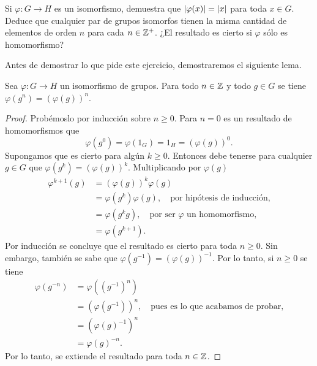 Si \( \varphi:G\to H \) es un isomorfismo, 
demuestra que \( \left\vert \varphi(x) \right\vert=\left\vert x \right\vert \) para toda 
\( x\in G \). Deduce que cualquier par de grupos isomorfos tienen la misma cantidad de elementos
de orden \( n \) para cada \( n\in \mathbb{Z}^+ \). ¿El resultado es cierto
si \( \varphi \) sólo es homomorfismo?

Antes de demostrar lo que pide este ejercicio, demostraremos el siguiente lema.
\setcounter{section}{2}
\begin{lemma}
    \label{lemma:potencias}
    Sea \( \varphi : G\to H \) un isomorfismo de grupos. Para todo \( n\in \mathbb{Z} \) y todo
    \( g\in G \) se
    tiene \( \varphi \left( g^n \right) = \left( \varphi ( g ) \right) ^n \).
\end{lemma}
\begin{proof}
    Probémoslo por inducción sobre \( n \geq 0\).
    Para \( n=0 \) es un resultado de homomorfismos que 
    \[
        \varphi \left( g^0 \right) = \varphi \left( 1_G \right) 
        =
        1_{H}
        =
        \left( \varphi \left( g \right) \right)^0.
    \]
    Supongamos que es cierto para algún \( k \geq 0 \). Entonces debe tenerse para cualquier
    \( g\in G \) que \( \varphi \left( g^k \right) = \left( \varphi\left( g \right) \right)^k \). 
    Multiplicando
    por \( \varphi \left( g \right) \) 
    \begin{align*}
        \varphi^{k+1} \left( g \right) 
        &=
        \left( \varphi ( g ) \right)^k  \varphi ( g ) \\
        &=
        \varphi \left( g^k \right) \varphi ( g ),\quad\text{por hipótesis de inducción,}\\
        &=
        \varphi \left( g^k g \right),\quad \text{por ser $\varphi$ un homomorfismo,}\\
        &=
        \varphi \left( g^{k+1} \right).
    \end{align*}
    Por inducción se concluye que el resultado es cierto para toda \( n\geq 0 \).
    Sin embargo, también se sabe que 
    \( \varphi \left( g^{-1}\right) = \left( \varphi ( g ) \right) ^{-1} \). Por lo tanto, 
    si \( n \geq 0 \) se tiene 
    \begin{align*}
        \varphi \left( g^{-n} \right) 
        &=
        \varphi \left( \left( g^{-1} \right) ^n \right) \\
        &=
        \left( \varphi \left( g^{-1} \right) \right) ^{n},
        \quad\text{pues es lo que acabamos de probar,}\\
        &=
        \left( \varphi ( g ) ^{-1} \right) ^n\\
        &=
        \varphi ( g ) ^{-n}.
    \end{align*}
    Por lo tanto, se extiende el resultado para toda \( n \in \mathbb{Z} \).
\end{proof}

